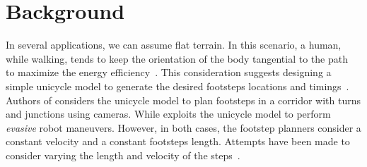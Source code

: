 \section{Background \label{sec:background-bachmarking}}

In several applications, we can assume flat terrain. In this scenario, a human, while walking, tends to keep the orientation of the body tangential to the path~\citep{Truong2010,Mombaur2010,flavigne2010reactive} to maximize the energy efficiency~\citep{handford2014sideways}. This consideration suggests designing a simple unicycle model to generate the desired footsteps locations and timings~\citep{Faragasso2013,cognetti2016real,8594277}. Authors of \citep{Faragasso2013} considers the unicycle model to plan footsteps in a corridor with turns and junctions using cameras. While \cite{cognetti2016real} exploits the unicycle model to perform \emph{evasive} robot maneuvers. However, in both cases, the footstep planners consider a constant velocity and a constant footsteps length. Attempts have been made to consider varying the length and velocity of the steps~\citep{8594277}.

